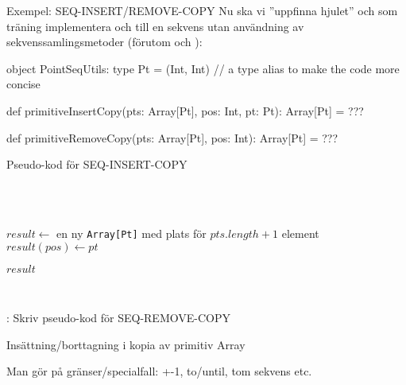 \begin{Slide}{Exempel: SEQ-INSERT/REMOVE-COPY}
Nu ska vi ''uppfinna hjulet'' och som träning implementera  och  till en  sekvens utan användning av sekvenssamlingsmetoder (förutom  och ):
\begin{Code}
object PointSeqUtils:
  type Pt = (Int, Int)  // a type alias to make the code more concise

  def primitiveInsertCopy(pts: Array[Pt], pos: Int, pt: Pt): Array[Pt] = ???

  def primitiveRemoveCopy(pts: Array[Pt], pos: Int): Array[Pt] = ???
\end{Code}
\end{Slide}




\begin{Slide}{Pseudo-kod för SEQ-INSERT-COPY}\SlideFontSmall
\begin{algorithm}[H]

  ~\\

 ~\\


 \noindent\hrulefill

  $result \leftarrow$ en ny \texttt{Array[Pt]} med plats för $pts.length + 1$ element \\
 $result(pos) \leftarrow pt$ \\

 \Return $result$

  \noindent\hrulefill\\
\end{algorithm}
\pause\vspace{0.5em}: Skriv pseudo-kod för SEQ-REMOVE-COPY
\end{Slide}

\begin{Slide}{Insättning/borttagning i kopia av primitiv Array}
\vspace{-0.6em}

\pause
\SlideFontSmall Man gör  på gränser/specialfall: +-1, to/until, tom sekvens etc.
\end{Slide}

